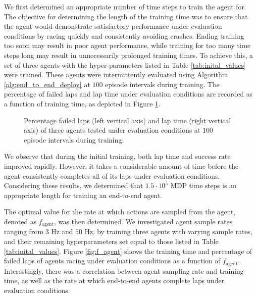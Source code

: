 We first determined an appropriate number of time steps to train the agent for.
The objective for determining the length of the training time was to ensure that the agent would demonstrate satisfactory performance under evaluation conditions by racing quickly and consistently avoiding crashes. 
Ending training too soon may result in poor agent performance, while training for too many time steps long may result in unnecessarily prolonged training times. 
To achieve this, a set of three agents with the hyper-parameters listed in Table \ref{tab:inital_values} were trained.
These agents were intermittently evaluated using Algorithm \ref{alg:end_to_end_deploy} at $100$ episode intervals during training.
The percentage of failed laps and lap time under evaluation conditions are recorded as a function of training time, as depicted in Figure \ref{fig:MDP_steps}. 

\begin{figure}[htb!]
    \centering
    
    \caption[Percentage failed laps and lap time of an end-to-end agent during training]{Percentage failed laps (left vertical axis) and lap time (right vertical axis) of three agents tested under evaluation conditions at $100$ episode intervals during training.}
    \label{fig:MDP_steps}
\end{figure}

We observe that during the initial training, both lap time and success rate improved rapidly. 
However, it takes a considerable amount of time before the agent consistently completes all of its laps under evaluation conditions. 
Considering these results, we determined that $1.5\cdot10^{5}$ MDP time steps is an appropriate length for training an end-to-end agent.



The optimal value for the rate at which actions are sampled from the agent, denoted as $f_{\text{agent}}$, was then determined.
We investigated agent sample rates ranging from $3$ Hz and $50$ Hz, by training three agents with varying sample rates, and their remaining hyperparameters set
equal to those listed in Table \ref{tab:inital_values}.
Figure \ref{fig:f_agent} shows the training time and percentage of failed laps of agents racing under evaluation conditions as a function of $f_{\text{agent}}$.  
Interestingly, there was a correlation between agent sampling rate and training time, as well as the rate at which end-to-end agents complete laps under evaluation conditions.

